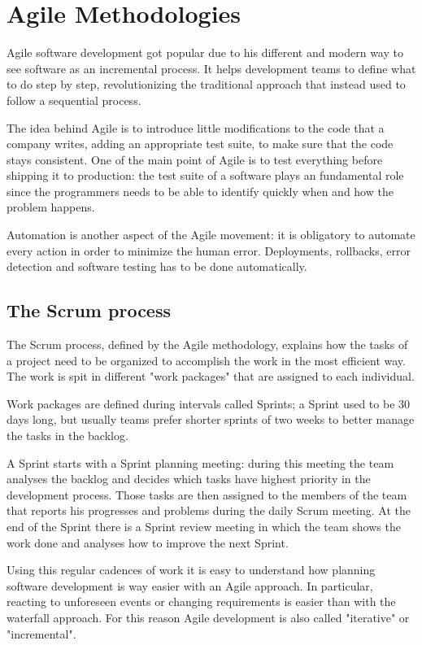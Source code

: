 \section{Agile Methodologies}

Agile software development got popular due to his different and modern way
to see software as an incremental process. It helps development teams to
define what to do step by step, revolutionizing the traditional approach
that instead used to follow a sequential process.

The idea behind Agile is to introduce little modifications to the code
that a company writes, adding an appropriate test suite, to make sure that
the code stays consistent. One of the main point of Agile is to test
everything before shipping it to production: the test suite of a software
plays an fundamental role since the programmers needs to be able to
identify quickly when and how the problem happens.

Automation is another aspect of the Agile movement: it is obligatory to
automate every action in order to minimize the human error. Deployments,
rollbacks, error detection and software testing has to be done
automatically.

\subsection{The Scrum process}

The Scrum process, defined by the Agile methodology, explains how the
tasks of a project need to be organized to accomplish the work in the most
efficient way. The work is spit in different "work packages" that are
assigned to each individual.

Work packages are defined during intervals called Sprints; a Sprint used
to be 30 days long, but usually teams prefer shorter sprints of two weeks
to better manage the tasks in the backlog.

A Sprint starts with a Sprint planning meeting: during this meeting the team
analyses the backlog and decides which tasks have highest priority in the
development process. Those tasks are then assigned to the members of the
team that reports his progresses and problems during the daily Scrum
meeting. At the end of the Sprint there is a Sprint review meeting in
which the team shows the work done and analyses how to improve the next
Sprint.

Using this regular cadences of work it is easy to understand how planning
software development is way easier with an Agile approach. In particular,
reacting to unforeseen events or changing requirements is easier than with
the waterfall approach. For this reason Agile development is also called
"iterative" or "incremental".

